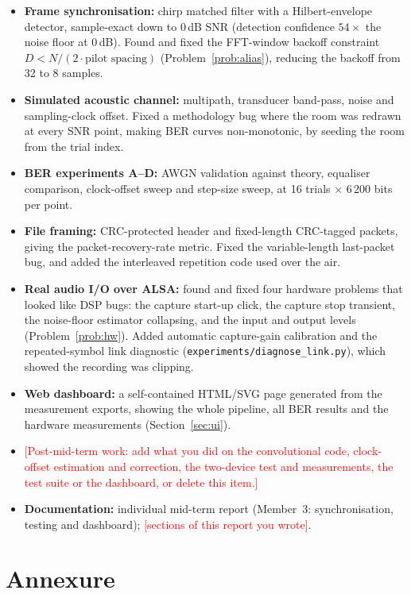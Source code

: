 \documentclass[11pt,a4paper]{report}
\newcommand{\fillin}[1]{\textcolor{red}{[#1]}}
\begin{document}
\begin{itemize}
    \item \textbf{Frame synchronisation:} chirp matched filter with a Hilbert-envelope
    detector, sample-exact down to 0\,dB SNR (detection confidence $54\times$ the noise
    floor at 0\,dB). Found and fixed the FFT-window backoff constraint
    $D<N/(2\cdot\text{pilot spacing})$ (Problem~\ref{prob:alias}), reducing the backoff
    from 32 to 8 samples.
    \item \textbf{Simulated acoustic channel:} multipath, transducer band-pass, noise and
    sampling-clock offset. Fixed a methodology bug where the room was redrawn at every
    SNR point, making BER curves non-monotonic, by seeding the room from the trial index.
    \item \textbf{BER experiments A--D:} AWGN validation against theory, equaliser
    comparison, clock-offset sweep and step-size sweep, at 16 trials $\times$ 6\,200 bits
    per point.
    \item \textbf{File framing:} CRC-protected header and fixed-length CRC-tagged
    packets, giving the packet-recovery-rate metric. Fixed the variable-length
    last-packet bug, and added the interleaved repetition code used over the air.
    \item \textbf{Real audio I/O over ALSA:} found and fixed four hardware problems that
    looked like DSP bugs: the capture start-up click, the capture stop transient, the
    noise-floor estimator collapsing, and the input and output levels
    (Problem~\ref{prob:hw}). Added automatic capture-gain calibration and the
    repeated-symbol link diagnostic (\texttt{experiments/diagnose\_link.py}), which
    showed the recording was clipping.
    \item \textbf{Web dashboard:} a self-contained HTML/SVG page generated from the
    measurement exports, showing the whole pipeline, all BER results and the hardware
    measurements (Section~\ref{sec:ui}).
    \item \fillin{Post-mid-term work: add what you did on the convolutional code,
    clock-offset estimation and correction, the two-device test and measurements, the
    test suite or the dashboard, or delete this item.}
    \item \textbf{Documentation:} individual mid-term report (Member~3: synchronisation,
    testing and dashboard); \fillin{sections of this report you wrote}.
\end{itemize}

\chapter{Annexure}
\end{document}
